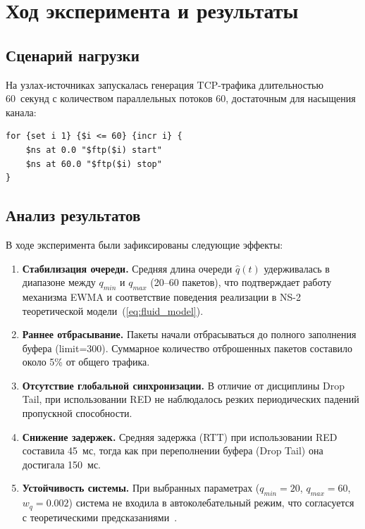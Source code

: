 \documentclass[%
]{ittmm}
\begin{document}
\section{Ход эксперимента и результаты}

\subsection{Сценарий нагрузки}

На узлах-источниках запускалась генерация TCP-трафика длительностью 60~секунд с количеством параллельных потоков 60, достаточным для насыщения канала:
\begin{verbatim}
for {set i 1} {$i <= 60} {incr i} {
    $ns at 0.0 "$ftp($i) start"
    $ns at 60.0 "$ftp($i) stop"
}
\end{verbatim}

\subsection{Анализ результатов}

В ходе эксперимента были зафиксированы следующие эффекты:

\begin{enumerate}
  \item \textbf{Стабилизация очереди.} Средняя длина очереди $\hat{q}(t)$ удерживалась в диапазоне между $q_{min}$ и $q_{max}$ (20--60 пакетов), что подтверждает работу механизма EWMA и соответствие поведения реализации в NS-2 теоретической модели~(\ref{eq:fluid_model}).

  \item \textbf{Раннее отбрасывание.} Пакеты начали отбрасываться до полного заполнения буфера (limit=300). Суммарное количество отброшенных пакетов составило около 5\% от общего трафика.

  \item \textbf{Отсутствие глобальной синхронизации.} В отличие от дисциплины Drop Tail, при использовании RED не наблюдалось резких периодических падений пропускной способности.

  \item \textbf{Снижение задержек.} Средняя задержка (RTT) при использовании RED составила 45~мс, тогда как при переполнении буфера (Drop Tail) она достигала 150~мс.

  \item \textbf{Устойчивость системы.} При выбранных параметрах ($q_{min}=20$, $q_{max}=60$, $w_q=0.002$) система не входила в автоколебательный режим, что согласуется с теоретическими предсказаниями~\cite{velieva2019phd}.
\end{enumerate}
\end{document}

